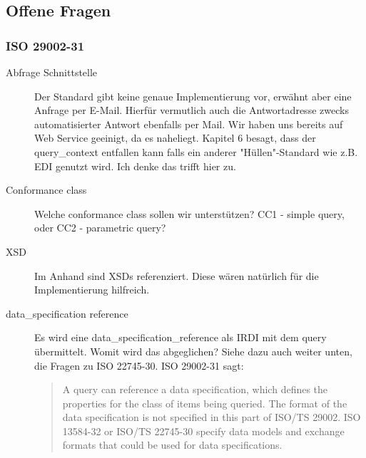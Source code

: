 \subsection{Offene Fragen}

\subsubsection{ISO 29002-31}
\begin{description}
\item[Abfrage Schnittstelle] Der Standard gibt keine genaue Implementierung vor, erwähnt aber eine Anfrage per E-Mail. Hierfür vermutlich auch die Antwortadresse zwecks automatisierter Antwort ebenfalls per Mail. Wir haben uns bereits auf Web Service geeinigt, da es naheliegt. Kapitel 6 besagt, dass der query\_context entfallen kann falls ein anderer "Hüllen"-Standard wie z.B. EDI genutzt wird. Ich denke das trifft hier zu. 
\item[Conformance class] Welche conformance class sollen wir unterstützen? CC1 - simple query, oder CC2 - parametric query?
\item[XSD] Im Anhand sind XSDs referenziert. Diese wären natürlich für die Implementierung hilfreich.
\item[data\_specification reference] Es wird eine data\_specification\_reference als IRDI mit dem query übermittelt. Womit wird das abgeglichen? Siehe dazu auch weiter unten, die Fragen zu ISO 22745-30.
ISO 29002-31 sagt: 
\begin{quotation}
A query can reference a data specification, which defines the properties for the class of items being queried. The format of the data specification is not specified in this part of ISO/TS 29002. ISO 13584-32 or ISO/TS 22745-30 specify data models and exchange formats that could be used for data specifications.
\end{quotation}
\end{description}


